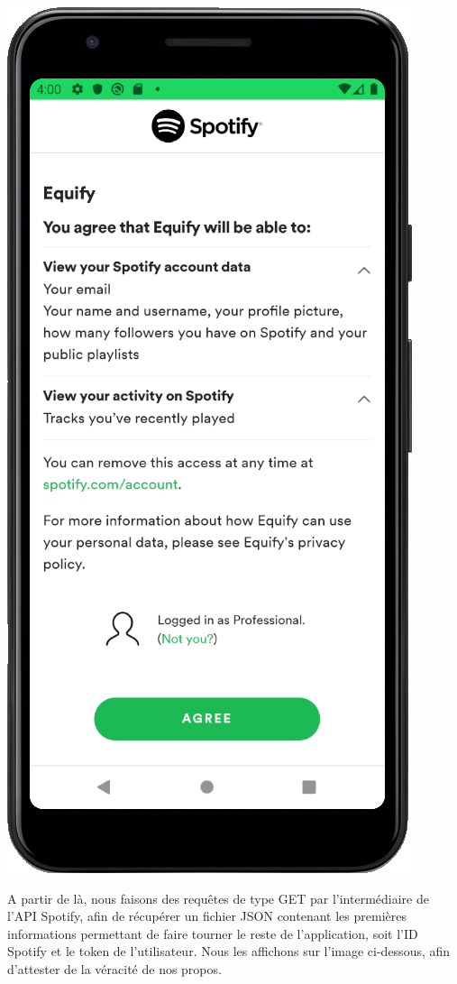 \documentclass[12pt, openany]{report}
\begin{document}
    \includegraphics[scale=0.5]{images/accord_spotify.png}
    
    \newpage
    
    A partir de là, nous faisons des requêtes de type GET par l'intermédiaire de l'API Spotify, afin de récupérer un fichier JSON contenant les premières informations permettant de faire tourner le reste de l'application, soit l'ID Spotify et le token de l'utilisateur. Nous les affichons sur l'image ci-dessous, afin d'attester de la véracité de nos propos.
    \\
    \\
    
\end{document}
